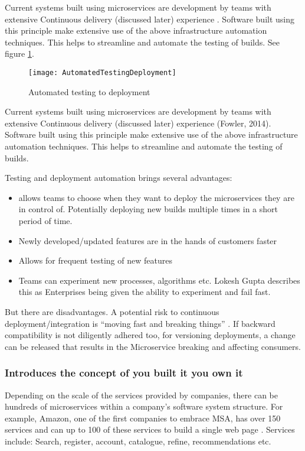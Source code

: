 Current systems built using microservices are development by teams with extensive Continuous delivery (discussed later) experience \cite{MartinFowlersite}. Software built using this principle make extensive use of the above infrastructure automation techniques. This helps to streamline and automate the testing of builds.  See figure \ref{fig:autoTestDeploy}.
\begin{figure}[h]
	\caption{Automated testing to deployment}
	\label{fig:autoTestDeploy}
	\texttt{[image: AutomatedTestingDeployment]}
	\centering
\end{figure}
Current systems built using microservices are development by teams with extensive Continuous delivery (discussed later) experience (Fowler, 2014). Software built using this principle make extensive use of the above infrastructure automation techniques. This helps to streamline and automate the testing of builds.

Testing and deployment automation brings several advantages:
\begin{itemize}
	\item allows teams to choose when they want to deploy the microservices they are in control of. Potentially deploying new builds multiple times in a short period of time.
	\item Newly developed/updated features are in the hands of customers faster
	\item Allows for frequent testing of new features
	\item Teams can experiment new processes, algorithms etc. Lokesh Gupta \cite{GuptaMSA} describes this as Enterprises being given the ability to experiment and fail fast.
\end{itemize}
But there are disadvantages.
A potential risk to continuous deployment/integration is “moving fast and breaking things” \cite{HunterAdvMSA}. If backward compatibility is not diligently adhered too, for versioning deployments, a change can be released that results in the Microservice breaking and affecting consumers.
\subsubsection{Introduces the concept of you built it you own it}
Depending on the scale of the services provided by companies, there can be hundreds of microservices within a company’s software system structure. For example, Amazon, one of the first companies to embrace MSA, has over 150 services and can up to 100 of these services to build a single web page \cite{HoffAmazonArchi}. Services include: Search, register, account, catalogue, refine, recommendations etc.

